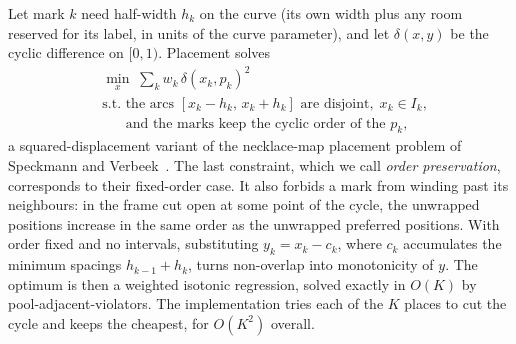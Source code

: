 Let mark $k$ need half-width $h_k$ on the curve (its own width plus any room
reserved for its label, in units of the curve parameter), and let
$\delta(x,y)$ be the cyclic difference on $[0,1)$. Placement solves
\begin{equation}
  \begin{aligned}
    &\min_{x}\; \sum_{k} w_k\, \delta(x_k,p_k)^2 \\
    &\text{s.t. the arcs } [x_k-h_k,\,x_k+h_k] \text{ are disjoint},\;
    x_k\in I_k, \\
    &\phantom{\text{s.t. }}\text{and the marks keep the cyclic order of the } p_k,
  \end{aligned}
  \label{eq:placement}
\end{equation}
a squared-displacement variant of the necklace-map placement problem of
Speckmann and Verbeek~\cite{speckmann2010necklace,speckmann2015algorithms}. The
last constraint, which we call \emph{order preservation}, corresponds to their
fixed-order case. It also forbids a mark from winding past its neighbours: in the
frame cut open at some point of the cycle, the unwrapped positions increase in
the same order as the unwrapped preferred positions. With order fixed and no
intervals, substituting $y_k=x_k-c_k$, where $c_k$ accumulates the minimum
spacings $h_{k-1}+h_k$, turns non-overlap into monotonicity of $y$. The
optimum is then a weighted isotonic regression, solved exactly in $O(K)$ by
pool-adjacent-violators. The implementation tries each of the $K$ places to cut
the cycle and keeps the cheapest, for $O(K^2)$ overall.

